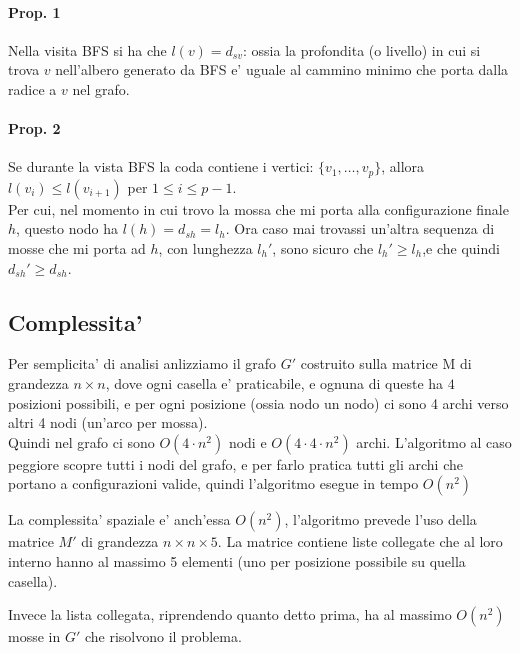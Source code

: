 \paragraph{Prop. 1}
Nella visita BFS si ha che $l(v) = d_{sv}$: ossia la profondita (o livello) in cui si trova $v$ 
nell'albero generato da BFS e' uguale al cammino minimo che porta dalla radice a $v$ nel grafo. \\

\paragraph{Prop. 2}
Se durante la vista BFS la coda contiene i vertici: $\{v_1, \dots, v_p\}$, allora $l(v_i) \leq l(v_{i+1})$
per $1 \leq i \leq p-1$. \\

Per cui, nel momento in cui trovo la mossa che mi porta alla configurazione finale $h$, questo nodo ha $l(h) = d_{sh} = l_h$.
Ora caso mai trovassi un'altra sequenza di mosse che mi porta ad $h$, con lunghezza $l_h'$, sono sicuro che $l_h' \geq l_h$,e 
che quindi $d_{sh}' \geq d_{sh}$.

\subsection{Complessita'}
Per semplicita' di analisi anlizziamo il grafo $G'$ costruito sulla matrice M di grandezza $n \times n$, dove ogni casella e' praticabile, e ognuna di queste 
ha $4$ posizioni possibili, e per ogni posizione (ossia nodo un nodo) ci sono 4 archi verso altri 4 nodi (un'arco per 
mossa). \\

Quindi nel grafo ci sono $O(4 \cdot n^2)$ nodi e $O(4 \cdot 4 \cdot n^2)$ archi. L'algoritmo al caso peggiore
scopre tutti i nodi del grafo, e per farlo pratica tutti gli archi che portano a configurazioni valide, quindi
l'algoritmo esegue in tempo $O(n^2)$

La complessita' spaziale e' anch'essa $O(n^2)$, l'algoritmo prevede l'uso della matrice $M'$ di grandezza $n \times n \times 5$.
La matrice contiene liste collegate che al loro interno hanno al massimo 5 elementi (uno per posizione possibile su quella casella).

Invece la lista collegata, riprendendo quanto detto prima, ha al massimo $O(n^2)$ mosse in $G'$ che risolvono il problema. 

\newpage
\begin{tcolorbox}[
    colback=white,           %
    colframe=black,          %
    coltitle=black,          %
    colbacktitle=gray!50,    %
    boxrule=1pt,             %
    title=\textbf{Commenti Esercizio}
    ]
    
\vspace{45\baselineskip}

\end{tcolorbox}
\newpage

